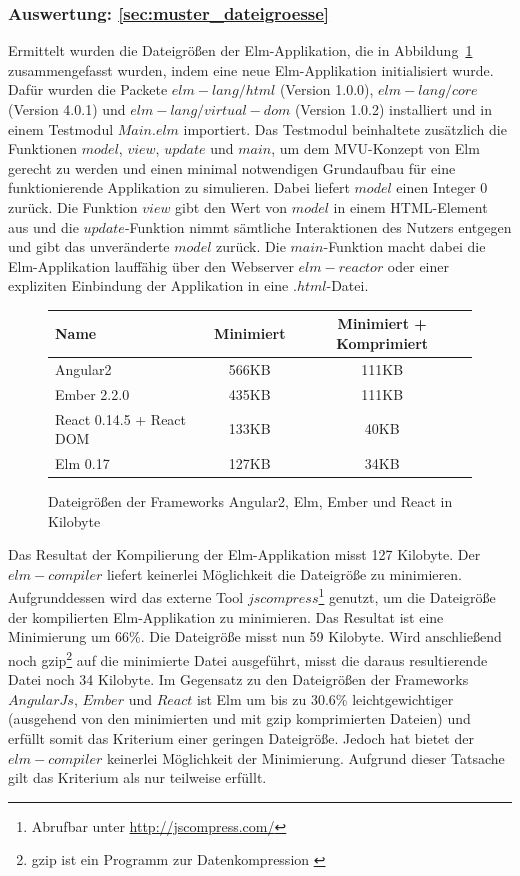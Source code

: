 \subsubsection{Auswertung: \ref{sec:muster_dateigroesse} }
Ermittelt wurden die Dateigrößen der Elm-Applikation, die in Abbildung~\ref{fig:dateigroesse-stats} zusammengefasst wurden, indem eine neue Elm-Applikation initialisiert wurde. Dafür wurden die Packete $elm-lang/html$ (Version 1.0.0), $elm-lang/core$ (Version 4.0.1) und $elm-lang/virtual-dom$ (Version 1.0.2) installiert und in einem Testmodul $Main.elm$ importiert.
Das Testmodul beinhaltete zusätzlich die Funktionen $model$, $view$, $update$ und $main$, um dem \ac{MVU}-Konzept von Elm gerecht zu werden und einen minimal notwendigen Grundaufbau für eine funktionierende Applikation zu simulieren. Dabei liefert $model$ einen Integer $0$ zurück. Die Funktion $view$ gibt den Wert von $model$ in einem \ac{HTML}-Element aus und die $update$-Funktion nimmt sämtliche Interaktionen des Nutzers entgegen und gibt das unveränderte $model$ zurück. Die $main$-Funktion macht dabei die Elm-Applikation lauffähig über den Webserver $elm-reactor$ oder einer expliziten Einbindung der Applikation in eine $.html$-Datei. 
\begin{figure}[h!]
	\begin{tabular}{ | p{7cm} | c | c |}
	\hline
	 \textbf{Name} 				& \textbf{Minimiert} 	& \textbf{Minimiert + Komprimiert}\\
	 \hline
	 Angular2 					& 566KB	& 111KB\\
	 \hline
	 Ember 2.2.0 				& 435KB & 111KB\\
	 \hline
	 React 0.14.5 + React DOM	& 133KB & 40KB\\
	 \hline
	 Elm 0.17					& 127KB & 34KB\\
	 \hline
	\end{tabular}
\caption{Dateigrößen der Frameworks Angular2, Elm, Ember und React in Kilobyte}\label{fig:dateigroesse-stats}
\end{figure}
Das Resultat der Kompilierung der Elm-Applikation misst 127 Kilobyte. Der $elm-compiler$ liefert keinerlei Möglichkeit die Dateigröße zu minimieren. Aufgrunddessen wird das externe Tool $jscompress$\footnote{Abrufbar unter \url{http://jscompress.com/}} genutzt, um die Dateigröße der kompilierten Elm-Applikation zu minimieren. Das Resultat ist eine Minimierung um 66\%. Die Dateigröße misst nun 59 Kilobyte. Wird anschließend noch gzip\footnote{gzip ist ein Programm zur Datenkompression \cite[Vgl.]{google-gzip}} auf die minimierte Datei ausgeführt, misst die daraus resultierende Datei noch 34 Kilobyte. Im Gegensatz zu den Dateigrößen der Frameworks $AngularJs$, $Ember$ und $React$ ist Elm um bis zu 30.6\% leichtgewichtiger (ausgehend von den minimierten und mit gzip komprimierten Dateien) und erfüllt somit das Kriterium einer geringen Dateigröße. Jedoch hat bietet der $elm-compiler$ keinerlei Möglichkeit der Minimierung. Aufgrund dieser Tatsache gilt das Kriterium als nur teilweise erfüllt.